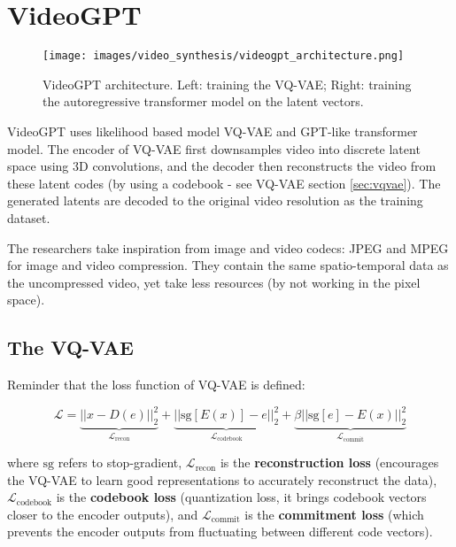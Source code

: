 \section{VideoGPT}
\label{sec:videogpt}

\begin{figure}
    \centering
    \texttt{[image: images/video\_synthesis/videogpt\_architecture.png]}
    \caption{VideoGPT architecture. Left: training the VQ-VAE; Right: training the autoregressive transformer model on the latent vectors.}
\end{figure}

VideoGPT \cite{videogpt} uses likelihood based model VQ-VAE and GPT-like transformer model. The encoder of VQ-VAE first downsamples video into discrete latent space using 3D convolutions, and the decoder then reconstructs the video from these latent codes (by using a codebook - see VQ-VAE section \ref{sec:vqvae}). The generated latents are decoded to the original video resolution as the training dataset.

The researchers take inspiration from image and video codecs: JPEG and MPEG for image and video compression. They contain the same spatio-temporal data as the uncompressed video, yet take less resources (by not working in the pixel space).

\subsection*{The VQ-VAE}

Reminder that the loss function of VQ-VAE is defined:

\begin{equation*}
    \mathcal{L} = \underbrace{\left| \left| x - D(e) \right| \right|^2_2}_{\mathcal{L}_\text{recon}} + \underbrace{\left| \left| \text{sg}\left[ E(x) \right] - e \right| \right|^2_2}_{\mathcal{L}_\text{codebook}} + \underbrace{\beta \left| \left| \text{sg}[e] - E(x) \right| \right|^2_2}_{\mathcal{L}_\text{commit}}
\end{equation*}

where $\text{sg}$ refers to stop-gradient, $\mathcal{L}_\text{recon}$ is the \textbf{reconstruction loss} (encourages the VQ-VAE to learn good representations to accurately reconstruct the data), $\mathcal{L}_\text{codebook}$ is the \textbf{codebook loss} (quantization loss, it brings codebook vectors closer to the encoder outputs), and $\mathcal{L}_\text{commit}$ is the \textbf{commitment loss} (which prevents the encoder outputs from fluctuating between different code vectors). 

